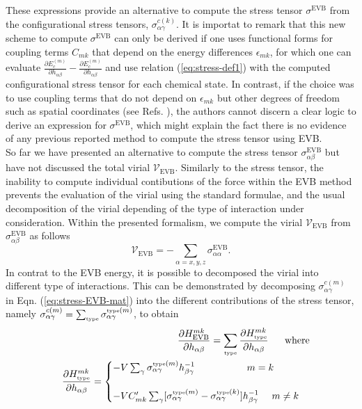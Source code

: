 These expressions provide an alternative to compute the stress tensor $\sigma^{\text{EVB}}$ from the configurational stress tensors, $\sigma_{\alpha\gamma}^{c(k)}$. It is importat to remark that this new scheme to compute $\sigma^{\text{EVB}}$ can only be derived if one uses functional forms for coupling terms $C_{mk}$ that depend on the energy differences $\epsilon_{mk}$, for which one can evaluate $\frac{\partial E_{c}^{(m)}}{\partial h_{\alpha\beta}}-\frac{\partial E_{c}^{(m)}}{\partial h_{\alpha\beta}}$ and use relation (\ref{eq:stress-def1}) with the computed configurational stress tensor for each chemical state. In contrast, if the choice was to use coupling terms that do not depend on $\epsilon_{mk}$ but other degrees of freedom such as spatial coordinates (see Refs. \cite{chang1990,truhlar2000,schlegel2006,sonnenberg2007,sonnenberg2009}), the authors cannot discern a clear logic to derive an expression for $\sigma^{\text{EVB}}$, which might explain the fact there is no evidence of any previous reported method to compute the stress tensor using EVB. \\
So far we have presented an alternative to compute the stress tensor $\sigma_{\alpha\beta}^{\text{EVB}}$ but have not discussed the total virial $\mathcal{V}_{\text{EVB}}$. Similarly to the stress tensor, the inability to compute individual contibutions of the force within the EVB method prevents the evaluation of the virial using the standard formulae, and the usual decomposition of the virial depending of the type of interaction under consideration. Within the presented formalism, we compute the virial $\mathcal{V}_{\text{EVB}}$ from $\sigma_{\alpha\beta}^{\text{EVB}}$ as follows
\begin{equation}\label{eq:virial-total}
\mathcal{V}_{\text{EVB}}=-\sum_{\alpha=x,y,z} \sigma_{\alpha\alpha}^{\text{EVB}}.
\end{equation}
In contrat to the EVB energy, it is possible to decomposed the virial into different type of interactions. This can be demonstrated by decomposing $\sigma_{\alpha\gamma}^{c(m)}$ in Eqn. (\ref{eq:stress-EVB-mat}) into the different contributions of the stress tensor, namely $\sigma_{\alpha\gamma}^{c(m)}=\sum_{\text{\tiny{type}}} \sigma_{\alpha\gamma}^{\text{\tiny{type}}(m)}$, to obtain
\begin{eqnarray}\label{eq:stress-EVB-mat-dec}
&&\frac{\partial H^{mk}_{\text{EVB}}}{\partial h_{\alpha\beta}}=\sum_{\text{\tiny{type}}} \frac{\partial H^{mk}_{\text{\tiny{type}}}}{\partial h_{\alpha\beta}} \,\,\,\,\,\,\,\,\ \text{where}\\
&&\frac{\partial H^{mk}_{\text{\tiny{type}}}}{\partial h_{\alpha\beta}}=\begin{cases}
-V\sum_{\gamma}\sigma_{\alpha\gamma}^{\text{\tiny{type}}(m)}h^{-1}_{\beta\gamma} \,\,\,\,\,\,\,\,\,\,\,\,\,\,\,\,\,\,\,\,\,\,\,\,\,\,\,\,\,\,\,\,  m=k  \\
\\
-VC^{\prime}_{mk}\sum_{\gamma}[\sigma_{\alpha\gamma}^{\text{\tiny{type}}(m)}-\sigma_{\alpha\gamma}^{\text{\tiny{type}}(k)}] h^{-1}_{\beta\gamma}  \,\,\,\,\,\,\,\,   m \ne k \\
\end{cases} \nonumber 
\end{eqnarray}
